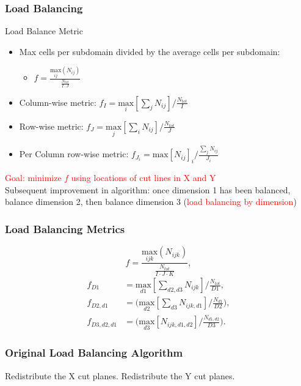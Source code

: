 \documentclass[xcolor={usenames,dvipsnames,svgnames,table}]{beamer}
\newcommand{\tcr}[1]{\textcolor{red}{#1}}
\begin{document}
\begin{frame}[t]\frametitle{Load Balancing}
\begin{block}{Load Balance Metric}
  \begin{itemize}
    \item Max cells per subdomain divided by the average cells per subdomain:
      \begin{itemize}
        \item$f =\frac{\underset{ij}{\text{max}}(N_{ij})}{\frac{N_{tot}}{I\cdot J}}$
      \end{itemize}
    \item Column-wise metric: $f_I = \underset{i}{\text{max}}[\sum_{j} N_{ij}]/\frac{N_{tot}}{I}$
    \item Row-wise metric: $f_J = \underset{j}{\text{max}}[\sum_{i} N_{ij}]/\frac{N_{tot}}{J}$
    \item Per Column row-wise metric: $f_{J_i} = \text{max}[N_{ij}]_i/\frac{\sum_{j}N_{ij}}{J_i}$
  \end{itemize}		
  \tcr{Goal: minimize $f$ using locations of cut lines in X and Y}\\
    
  Subsequent improvement in algorithm: once dimension 1 has been balanced, balance dimension 2, then balance dimension 3 (\tcr{load balancing by dimension})
\end{block}
\end{frame}
\begin{frame}[t]\frametitle{Load Balancing Metrics}
\begin{equation}
f =\frac{\underset{ijk}{\text{max}}(N_{ijk})}{\frac{N_{tot}}{I\cdot J\cdot K}},
\label{metric_def}
\end{equation}
\begin{align}
f_{D1} &= \underset{d1}{\text{max}}[\sum_{d2,d3} N_{ijk}]/\frac{N_{tot}}{D1}, \label{f_d1} \\
f_{D2,d1} &= \Big(\underset{d2}{\text{max}}[\sum_{d3} N_{ijk,d1}]/\frac{N_{d1}}{D2}\Big), \label{f_d2}\\
f_{D3,d2,d1} &= \Big( \underset{d3}{\text{max}}[ N_{ijk,d1,d2}]/\frac{N_{d1,d2}}{D3} \Big) . \label{f_d3}
\end{align}
\end{frame}

\begin{frame}[t]\frametitle{Original Load Balancing Algorithm}
\begin{algorithm}[H]
\label{initial_algorithm}
\begin{algorithmic}

    \STATE Redistribute the X cut planes.
  \ENDIF
  	\STATE Redistribute the Y cut planes.
  \ENDIF
\ENDWHILE
\end{algorithmic}
\end{algorithm}
\end{frame}
\end{document}
